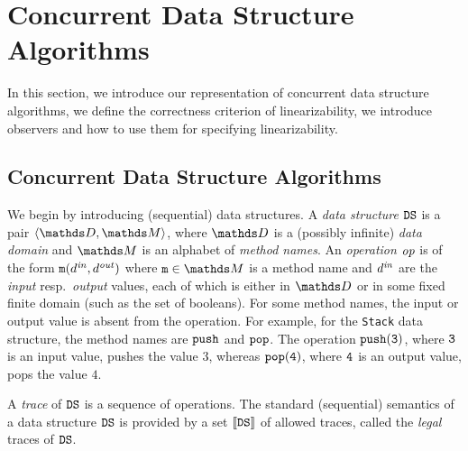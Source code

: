 \section{Concurrent Data Structure Algorithms}
\label{programs:section}

In this section, we introduce our representation of
concurrent data structure algorithms, we define the correctness criterion of
linearizability, we introduce observers and how to use them for specifying
linearizability.

\subsection{Concurrent Data Structure Algorithms}

We begin by introducing (sequential) data structures.
A {\it data structure} ${\tt DS}$ is a pair
$\tuple{\ddomain,\malphabet}$,
where $\ddomain$ is a (possibly infinite) {\it data domain} and 
$\malphabet$ is an alphabet of {\em method names}.
%
%
An {\it operation} 
${\it op}$ is of the form
${\tt m}(d^{\it in},d^{\it out})$ where 
$\mname\in\malphabet$ is a method name and 
$d^{\it in}$ are the {\it input} resp.\ {\it output} values, each of which
is either in $\ddomain$ or in some fixed finite domain (such as the set of
booleans).
%
For some method names, the input or output value is absent from the operation.
For example, for the {\tt Stack} data structure, the method names
are $\tt push$ and $\tt pop$.
%
The operation ${\tt push(3)}$, where $\tt 3$ is an input value, pushes
the value $3$, whereas ${\tt pop(4)}$, where $\tt 4$ is an output value,
pops the value $4$.

A {\it trace} of ${\tt DS}$ is a sequence of operations.
The standard (sequential) semantics of a data structure ${\tt DS}$ is provided by
a set $\left\llbracket{{\tt DS}}\right\rrbracket$ of allowed traces,
called the {\it legal} traces of ${\tt DS}$.
%

%



